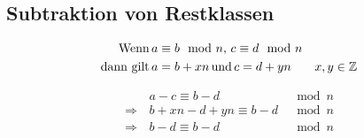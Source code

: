 \documentclass{article}
\begin{document}
\subsection{Subtraktion von Restklassen}

\begin{align*}
	\textnormal{Wenn}\,     & a \equiv b \mod n,\,c \equiv d \mod n\\
	\textnormal{dann gilt}\,& a = b + xn\,\textnormal{und}\,c = d + yn & x,y \in \mathbb{Z}
\end{align*}

\begin{align*}
				 & a - c \equiv b - d           & \mod n\\
	\Rightarrow\,& b + xn - d + yn \equiv b - d & \mod n\\
	\Rightarrow\,& b - d \equiv b - d           & \mod n\\
\end{align*}
\end{document}
